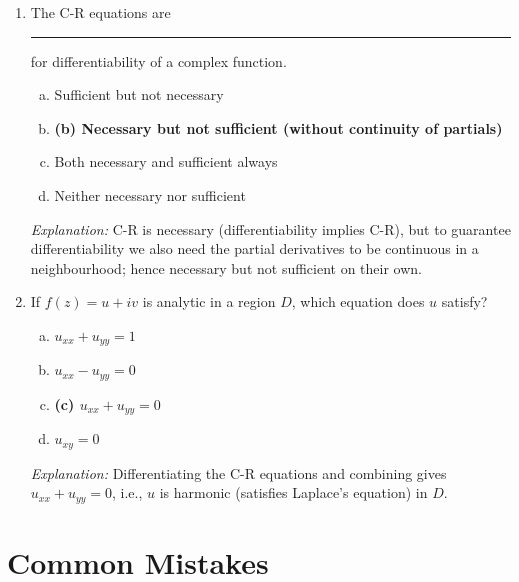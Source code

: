 \documentclass[12pt,a4paper]{article}
\begin{document}
\begin{enumerate}
  \medskip

  \item The C-R equations are \rule{1.5cm}{0.4pt} for differentiability of a complex function.
  \begin{enumerate}[(a)]
    \item Sufficient but not necessary
    \item \textbf{(b) Necessary but not sufficient (without continuity of partials)}
    \item Both necessary and sufficient always
    \item Neither necessary nor sufficient
  \end{enumerate}
  \textit{Explanation:} C-R is necessary (differentiability implies C-R), but to guarantee differentiability we also need the partial derivatives to be continuous in a neighbourhood; hence necessary but not sufficient on their own.

  \medskip

  \item If $f(z) = u + iv$ is analytic in a region $D$, which equation does $u$ satisfy?
  \begin{enumerate}[(a)]
    \item $u_{xx} + u_{yy} = 1$
    \item $u_{xx} - u_{yy} = 0$
    \item \textbf{(c) $u_{xx} + u_{yy} = 0$}
    \item $u_{xy} = 0$
  \end{enumerate}
  \textit{Explanation:} Differentiating the C-R equations and combining gives $u_{xx} + u_{yy} = 0$, i.e., $u$ is harmonic (satisfies Laplace's equation) in $D$.
\end{enumerate}

\section{Common Mistakes}
\end{document}
